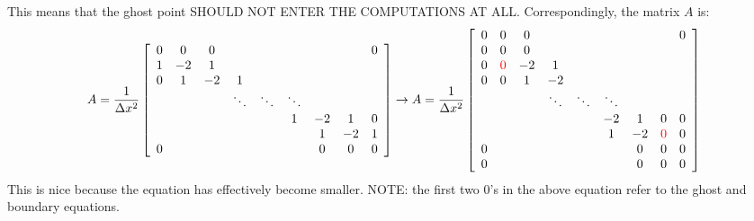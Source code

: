 \documentclass[landscape]{article}
\begin{document}
This means that the ghost point SHOULD NOT ENTER THE COMPUTATIONS AT ALL. Correspondingly, the matrix $A$ is:
\[ A = \frac{1}{\Delta x^2} \left[\begin{array}{ccccccccc}
0  & 0     & 0         &           &           &           &           &         &  0 \\
1  & -2    & 1         &           &           &           &           &         &    \\
0  & 1     & -2        & 1         &           &           &           &         &    \\
   &       &           & \ddots    & \ddots    & \ddots    &           &         &    \\
   &       &           &           &           & 1         & -2        & 1       &  0 \\
   &       &           &           &           &           &  1        & -2      &  1 \\
0  &       &           &           &           &           &  0        & 0       &  0 \\
\end{array} \right]
\rightarrow
A = \frac{1}{\Delta x^2} \left[\begin{array}{ccccccccc}
0  & 0     & 0         &           &           &           &           &         &  0 \\
0  & 0     & 0         &           &           &           &           &         &    \\
0  & \textcolor{red}{0}     & -2        & 1         &           &           &           &         &    \\
0  & 0     & 1         & -2        &           &           &           &         &    \\
   &       &           & \ddots    & \ddots    & \ddots    &           &         &    \\
   &       &           &           &           & -2        & 1         & 0       &  0 \\
   &       &           &           &           & 1         & -2        & \textcolor{red}{0}       &  0 \\
0  &       &           &           &           &           &  0        & 0       &  0 \\
0  &       &           &           &           &           &  0        & 0       &  0 \\
\end{array} \right]
\]
This is nice because the equation has effectively become smaller. NOTE: the first two 0's in the above equation refer to the ghost and boundary equations.
\end{document}
